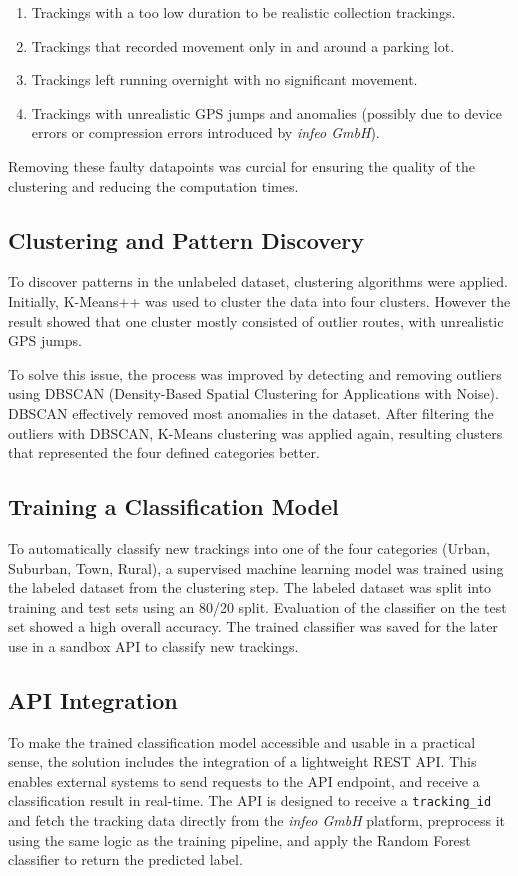 \documentclass[a4paper,12pt,twoside]{scrreprt}
\begin{document}
\begin{enumerate}
  \item Trackings with a too low duration to be realistic collection trackings.

  \item Trackings that recorded movement only in and around a parking lot.
  \item Trackings left running overnight with no significant movement.
  \item Trackings with unrealistic GPS jumps and anomalies (possibly due to
        device errors or compression errors introduced by \textit{infeo GmbH}).
\end{enumerate}

Removing these faulty datapoints was curcial for ensuring the quality of the
clustering and reducing the computation times.

\subsection{Clustering and Pattern Discovery}
To discover patterns in the unlabeled dataset, clustering algorithms were
applied.
Initially, K-Means++ was used to cluster the data into four clusters. However
the result showed that one cluster mostly consisted of outlier routes, with
unrealistic GPS jumps.

To solve this issue, the process was improved by detecting and removing
outliers using DBSCAN (Density-Based Spatial Clustering for Applications with
Noise). DBSCAN effectively removed most anomalies in the dataset. After
filtering the outliers with DBSCAN, K-Means clustering was applied again,
resulting clusters that represented the four defined categories better.

\subsection{Training a Classification Model}
To automatically classify new trackings into one of the four categories (Urban,
Suburban, Town, Rural), a supervised machine learning model was trained using
the labeled dataset from the clustering step.
The labeled dataset was split into training and test sets using an 80/20 split.
Evaluation of the classifier on the test set showed a high overall accuracy.
The trained classifier was saved for the later use in a sandbox API to classify
new trackings.

\subsection{API Integration}
To make the trained classification model accessible and usable in a practical
sense, the solution includes the integration of a lightweight REST API.
This enables external systems to send requests to the API endpoint, and
receive a classification result in real-time.
The API is designed to receive a \texttt{tracking\_id} and fetch the tracking
data directly from the \textit{infeo GmbH} platform, preprocess it using the
same logic as the training pipeline, and apply the Random Forest classifier to
return the predicted label.
\end{document}

